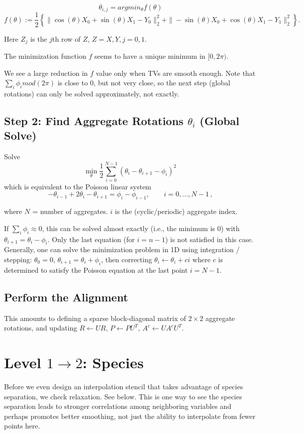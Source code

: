 \documentclass{article}
\begin{document}
$$ \theta_{i,j} = argmin_{\theta} f(\theta)$$
$$ f(\theta) := \frac12 \left\{ \|\cos(\theta) X_0 + \sin(\theta) X_1 - Y_0 \|_2^2 + \|-\sin(\theta) X_0 + \cos(\theta) X_1 - Y_1\|_2^2 \right\}. $$

Here $Z_j$ is the $j$th row of $Z$, $Z=X,Y, j=0,1$.

The minimization function $f$ seems to have a unique minimum in $[0, 2 \pi)$.

We see a large reduction in $f$ value only when TVs are smooth enough. Note that $\sum_i \phi_i mod (2 \pi)$ is close to $0$, but not very close, so the next step (global rotations) can only be solved approximately, not exactly.


\subsection{Step 2: Find Aggregate Rotations $\theta_{i}$ (Global Solve)}
Solve
$$ \min_{\theta} \frac12 \sum_{i=0}^{N-1} \left(\theta_{i} - \theta_{i+1} - \phi_{i} \right)^2\, $$
which is equivalent to the Poisson linear system
$$ -\theta_{i-1} + 2 \theta_i - \theta_{i+1} = \phi_{i} - \phi_{i-1}, \qquad i = 0,\dots, N-1\,, $$

where $N$ = number of aggregates. $i$ is the (cyclic/periodic) aggregate index.

If $\sum_i \phi_i \approx 0$, this can be solved almost exactly (i.e., the minimum is $0$) with $\theta_{i+1} = \theta_{i} - \phi_i$. Only the last equation (for $i=n-1$) is not satisfied in this case. Generally, one can solve the minimization problem in 1D using integration / stepping: $\theta_0=0$, $\theta_{i+1} = \theta_i + \phi_i$, then correcting $\theta_i \leftarrow \theta_i + c i$ where $c$ is determined to satisfy the Poisson equation at the last point $i = N-1.$

\subsection{Perform the Alignment}
This amounts to defining a sparse block-diagonal matrix of $2 \times 2$ aggregate rotations, and updating $R \leftarrow U R$, $P \leftarrow P U^T$, $A^c \leftarrow U A^c U^T$.

\section{Level $1 \rightarrow 2$: Species}
Before we even design an interpolation stencil that takes advantage of species separation, we check relaxation. See below. This is one way to see the species separation leads to stronger correlations among neighboring variables and perhaps promotes better smoothing, not just the ability to interpolate from fewer points here.
\end{document}
